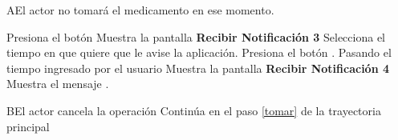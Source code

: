 \begin{UCtrayectoriaA}{A}{El actor no tomará el medicamento en ese momento.}
	
\UCpaso [\UCactor] Presiona el botón 
\UCpaso Muestra la pantalla \textbf{Recibir Notificación 3}
\UCpaso [\UCactor] Selecciona el tiempo en que quiere que le avise la aplicación.
\UCpaso [\UCactor] Presiona el botón . 
\UCpaso Pasando el tiempo ingresado por el usuario Muestra la pantalla \textbf{Recibir Notificación 4}
\UCpaso Muestra el mensaje .
\end{UCtrayectoriaA}

\begin{UCtrayectoriaA}{B}{El actor cancela la operación}
	\UCpaso Continúa en el paso \ref{tomar} de la trayectoria principal
\end{UCtrayectoriaA}



